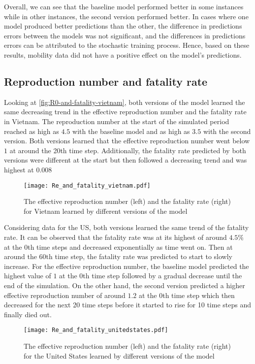Overall, we can see that the baseline model performed better in some instances while in other instances, the second version performed better.
In cases where one model produced better predictions than the other, the difference in predictions errors between the models was not significant, and the differences in predictions errors can be attributed to the stochastic training process.
Hence, based on these results, mobility data did not have a positive effect on the model's predictions.

\subsection{Reproduction number and fatality rate}

Looking at \autoref{fig:R0-and-fatality-vietnam}, both versions of the model learned the same decreasing trend in the effective reproduction number and the fatality rate in Vietnam.
The reproduction number at the start of the simulated period reached as high as $4.5$ with the baseline model and as high as $3.5$ with the second version.
Both versions learned that the effective reproduction number went below $1$ at around the 20th time step.
Additionally, the fatality rate predicted by both versions were different at the start but then followed a decreasing trend and was highest at $0.008$

\begin{figure}[!htb]
    \centering
    \texttt{[image: Re\_and\_fatality\_vietnam.pdf]}
    \caption{The effective reproduction number (left) and the fatality rate (right) for Vietnam learned by different versions of the model}
    \label{fig:R0-and-fatality-vietnam}
\end{figure}

Considering data for the \gls{US}, both versions learned the same trend of the fatality rate.
It can be observed that the fatality rate was at its highest of around $4.5$\% at the 0th time steps and decreased exponentially as time went on.
Then at around the 60th time step, the fatality rate was predicted to start to slowly increase.
For the effective reproduction number, the baseline model predicted the highest value of $1$ at the 0th time step followed by a gradual decrease until the end of the simulation.
On the other hand, the second version predicted a higher effective reproduction number of around $1.2$ at the 0th time step which then decreased for the next 20 time steps before it started to rise for 10 time steps and finally died out.

\begin{figure}[!htb]
    \centering
    \texttt{[image: Re\_and\_fatality\_unitedstates.pdf]}
    \caption{The effective reproduction number (left) and the fatality rate (right) for the United States learned by different versions of the model}
    \label{fig:R0-and-fatality-usa}
\end{figure}
